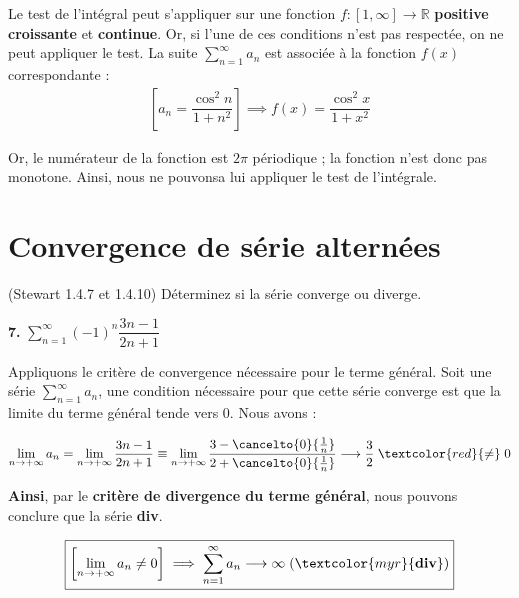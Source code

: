 \documentclass{report}
\begin{document}
    Le test de l'intégral peut s'appliquer sur une fonction 
    $f : [1, \infty] \rightarrow \mathbb{R}$ \textbf{positive} 
    \textbf{croissante} et \textbf{continue}. Or, si l'une de ces conditions n'est pas 
    respectée, on ne peut appliquer le test. La suite  
    $\sum_{n=1}^{\infty }a_n$ est associée à la fonction $f(x)$ correspondante :
    \begin{align*}
        \left[ a_n = \dfrac{\cos^2n}{1 + n^2}  \right]
        \implies f(x) = \dfrac{\cos^2x}{1 + x^2}
    \end{align*}            

    Or, le numérateur de la fonction est $2\pi$ périodique ; 
    la fonction n'est donc pas monotone. Ainsi, nous ne pouvonsa lui appliquer 
    le test de l'intégrale. 



    \section{Convergence de série alternées}
    \begin{Exercice}{(Stewart 1.4.7 et 1.4.10)}{}
        Déterminez si la série converge ou diverge.
    \end{Exercice}

    \noindent
    \textbf{7.} $\sum_{n=1}^{\infty }(-1)^n \dfrac{3n - 1}{2n + 1}$

    Appliquons le critère de convergence nécessaire pour le terme général. 
    Soit une série $\sum_{n=1}^{\infty }a_n$, une condition nécessaire pour que 
    cette série converge est que la limite du terme général tende vers 0. 
    Nous avons : 

    \begin{align*}
        \lim\limits_{n \to+\infty }a_n  =  
        \lim\limits_{n \to+\infty } \dfrac{3n - 1}{2n + 1} \equiv
        \lim\limits_{n \to+\infty }  
        \dfrac{3 - \cancelto{0}{\frac{1}{n}}}{2 + \cancelto{0}{\frac{1}{n}}}
        \longrightarrow \dfrac{3}{2} \; \textcolor{red}{\neq} \; 0 
    \end{align*}        

    \textbf{Ainsi}, par le \textbf{critère de divergence du terme général},
    nous pouvons conclure que la série \textcolor{myr}{\textbf{div}}.   
    
    \begin{align*}
        \boxed{
        \left[  \lim\limits_{n \to+\infty }a_n \neq 0  \right]
        \implies \sum_{n=1}^{\infty }a_n \longrightarrow \infty \; 
        (\textcolor{myr}{\textbf{div}} )
    }
    \end{align*}
\end{document}
